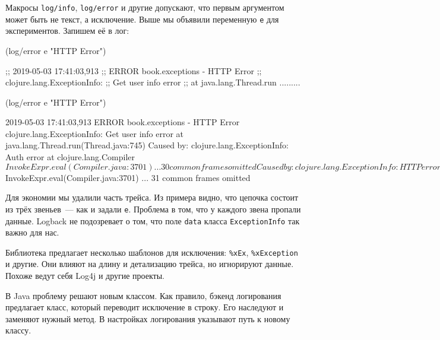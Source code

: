 \fi

\label{log-ex-param}

Макросы \verb|log/info|, \verb|log/error| и другие допускают, что первым
аргументом может быть не текст, а исключение. Выше мы объявили переменную
\verb|e| для экспериментов. Запишем её в лог:

\ifx\DEVICETYPE\MOBILE

\begin{english}
  \begin{clojure}
(log/error e "HTTP Error")

;; 2019-05-03 17:41:03,913
;; ERROR book.exceptions - HTTP Error
;; clojure.lang.ExceptionInfo:
;; Get user info error
;; at java.lang.Thread.run .........
  \end{clojure}
\end{english}

\else

\begin{english}
  \begin{clojure}
(log/error e "HTTP Error")

2019-05-03 17:41:03,913 ERROR book.exceptions - HTTP Error
clojure.lang.ExceptionInfo: Get user info error
    at java.lang.Thread.run(Thread.java:745)
Caused by: clojure.lang.ExceptionInfo: Auth error
    at clojure.lang.Compiler$InvokeExpr.eval(Compiler.java:3701)
    ... 30 common frames omitted
Caused by: clojure.lang.ExceptionInfo: HTTP error
    at clojure.lang.Compiler$InvokeExpr.eval(Compiler.java:3701)
    ... 31 common frames omitted
  \end{clojure}
\end{english}

\fi

Для экономии мы удалили часть трейса. Из примера видно, что цепочка состоит из
трёх звеньев~--- как и задали \verb|e|. Проблема в том, что у каждого звена
пропали данные. Logback не подозревает о том, что поле \verb|data| класса
\verb|ExceptionInfo| так важно для нас.


Библиотека предлагает несколько шаблонов для исключения: \verb|%xEx|,
\verb|%xException| и другие. Они влияют на длину и детализацию трейса, но
игнорируют данные. Похоже ведут себя Log4j и другие проекты.

В Java проблему решают новым классом. Как правило, бэкенд логирования предлагает
класс, который переводит исключение в строку. Его наследуют и заменяют нужный
метод. В настройках логирования указывают путь к новому классу.

